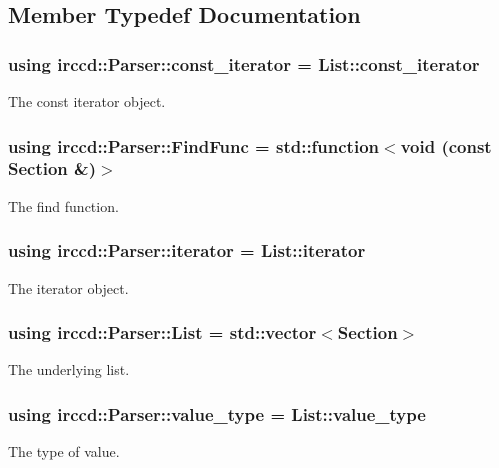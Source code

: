 \subsection{Member Typedef Documentation}
\hypertarget{a00048_a57eed4a7d37e60168450abc8acda10b3}{
\subsubsection[{const\-\_\-iterator}]{\setlength{\rightskip}{0pt plus 5cm}using {\bf irccd\-::\-Parser\-::const\-\_\-iterator} =  List\-::const\-\_\-iterator}}\label{a00048_a57eed4a7d37e60168450abc8acda10b3}
The const iterator object. \hypertarget{a00048_ae1acbe10817e492eff69dbc42c5483e8}{
\subsubsection[{Find\-Func}]{\setlength{\rightskip}{0pt plus 5cm}using {\bf irccd\-::\-Parser\-::\-Find\-Func} =  std\-::function$<$void (const {\bf Section} \&)$>$}}\label{a00048_ae1acbe10817e492eff69dbc42c5483e8}
The find function. \hypertarget{a00048_a94861c2c2808e8ae230f2186f8221b31}{
\subsubsection[{iterator}]{\setlength{\rightskip}{0pt plus 5cm}using {\bf irccd\-::\-Parser\-::iterator} =  List\-::iterator}}\label{a00048_a94861c2c2808e8ae230f2186f8221b31}
The iterator object. \hypertarget{a00048_a5f86fe625aa3b3ef61465bba6b9104cb}{
\subsubsection[{List}]{\setlength{\rightskip}{0pt plus 5cm}using {\bf irccd\-::\-Parser\-::\-List} =  std\-::vector$<${\bf Section}$>$}}\label{a00048_a5f86fe625aa3b3ef61465bba6b9104cb}
The underlying list. \hypertarget{a00048_af12b2b64f8ae5823e05e61c49c1a7bb3}{
\subsubsection[{value\-\_\-type}]{\setlength{\rightskip}{0pt plus 5cm}using {\bf irccd\-::\-Parser\-::value\-\_\-type} =  List\-::value\-\_\-type}}\label{a00048_af12b2b64f8ae5823e05e61c49c1a7bb3}
The type of value. 

